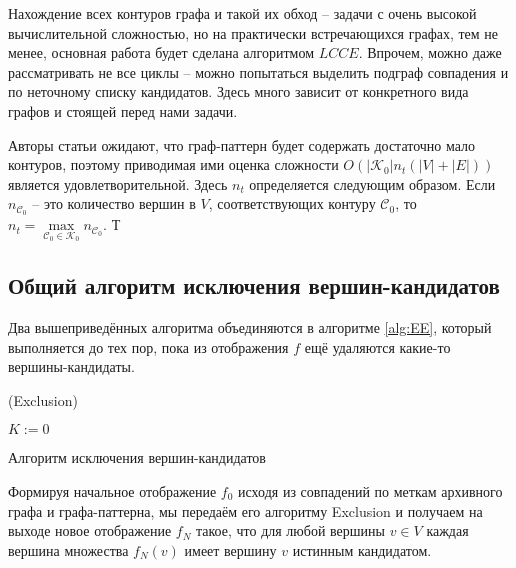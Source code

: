 Нахождение всех контуров графа и такой их обход -- задачи с очень высокой вычислительной сложностью, но на практически встречающихся графах, тем не менее, основная работа будет сделана алгоритмом $LCCE$. Впрочем, можно даже рассматривать не все циклы -- можно попытаться выделить подграф совпадения и по неточному списку кандидатов. Здесь много зависит от конкретного вида графов и стоящей перед нами задачи.

Авторы статьи \cite{patmat} ожидают, что граф-паттерн будет содержать достаточно мало контуров, поэтому приводимая ими оценка сложности $O(|\mathcal{K}_0|\allowbreak n_t \allowbreak (|V| + |E|))$ является удовлетворительной. Здесь $n_t$ определяется следующим образом. Если $n_{\mathcal{C}_0}$ -- это количество вершин в $V$, соответствующих контуру $\mathcal{C}_0$, то $n_t = \max\limits_{\mathcal{C}_0 \in \mathcal{K}_0} n_{\mathcal{C}_0}$. Т

\subsection{Общий алгоритм исключения вершин-кандидатов}

Два вышеприведённых алгоритма объединяются в алгоритме \ref{alg:EE}, который выполняется до тех пор, пока из отображения $f$ ещё удаляются какие-то вершины-кандидаты.

\begin{algorithm}
	\Large
	\Begin(Exclusion){
		$K := 0$
		
	}

	\caption{Алгоритм исключения вершин-кандидатов}
	\label{alg:EE}
\end{algorithm}

Формируя начальное отображение $f_0$ исходя из совпадений по меткам архивного графа и графа-паттерна, мы передаём его алгоритму Exclusion и получаем на выходе новое отображение $f_N$ такое, что для любой вершины $v \in V$ каждая вершина множества $f_N(v)$ имеет вершину $v$ истинным кандидатом.
